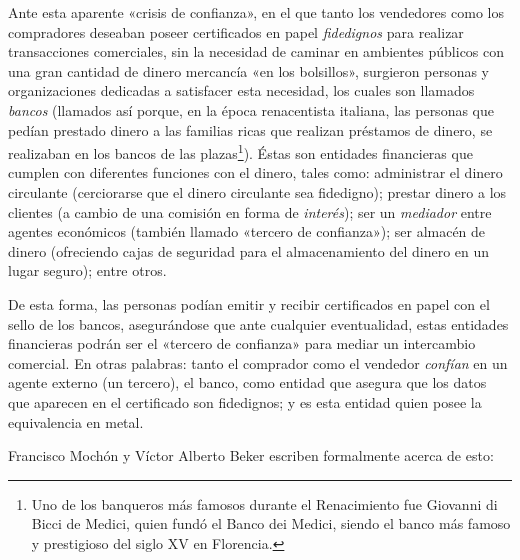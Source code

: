 \documentclass[12pt,a4paper,twoside]{book}
\begin{document}
Ante esta aparente «crisis de confianza», en el que tanto los vendedores como los compradores deseaban poseer certificados en papel \textit{fidedignos} para realizar transacciones comerciales, sin la necesidad de caminar en ambientes públicos con una gran cantidad de dinero mercancía «en los bolsillos», surgieron personas y organizaciones dedicadas a satisfacer esta necesidad, los cuales son llamados \textit{bancos} (llamados así porque, en la época renacentista italiana, las personas que pedían prestado dinero a las familias ricas que realizan préstamos de dinero, se realizaban en los bancos de las plazas\footnote{Uno de los banqueros más famosos durante el Renacimiento fue Giovanni di Bicci de Medici, quien fundó el Banco dei Medici, siendo el banco más famoso y prestigioso del siglo XV en Florencia.}). Éstas son entidades financieras que cumplen con diferentes funciones con el dinero, tales como: administrar el dinero circulante (cerciorarse que el dinero circulante sea fidedigno); prestar dinero a los clientes (a cambio de una comisión en forma de \textit{interés}); ser un \textit{mediador} entre agentes económicos (también llamado «tercero de confianza»); ser almacén de dinero (ofreciendo cajas de seguridad para el almacenamiento del dinero en un lugar seguro); entre otros.

De esta forma, las personas podían emitir y recibir certificados en papel con el sello de los bancos, asegurándose que ante cualquier eventualidad, estas entidades financieras podrán ser el «tercero de confianza» para mediar un intercambio comercial. En otras palabras: tanto el comprador como el vendedor \textit{confían} en un agente externo (un tercero), el banco, como entidad que asegura que los datos que aparecen en el certificado son fidedignos; y es esta entidad quien posee la equivalencia en metal.

Francisco Mochón y Víctor Alberto Beker escriben formalmente acerca de esto:
\end{document}
